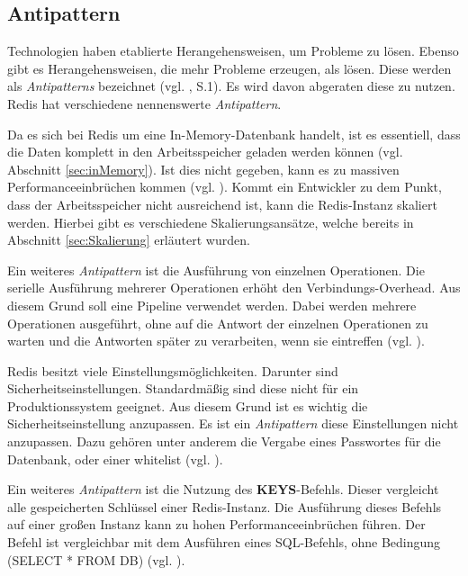 
\subsection{Antipattern}
Technologien haben etablierte Herangehensweisen, um Probleme zu lösen. Ebenso gibt es Herangehensweisen, die mehr Probleme erzeugen, als lösen. Diese werden als \textit{Antipatterns} bezeichnet (vgl. \cite{antipattern}, S.1). Es wird davon abgeraten diese zu nutzen. \acs{Redis} hat verschiedene nennenswerte \textit{Antipattern}.

Da es sich bei \acs{Redis} um eine In-Memory-Datenbank handelt, ist es essentiell, dass die Daten komplett in den Arbeitsspeicher geladen werden können (vgl. Abschnitt \ref{sec:inMemory}). Ist dies nicht gegeben, kann es zu massiven Performanceeinbrüchen kommen (vgl. \cite{Redis-Docs-antipattern}). Kommt ein Entwickler zu dem Punkt, dass der Arbeitsspeicher nicht ausreichend ist, kann die \acs{Redis}-Instanz skaliert werden. Hierbei gibt es verschiedene Skalierungsansätze, welche bereits in Abschnitt \ref{sec:Skalierung} erläutert wurden.

Ein weiteres \textit{Antipattern} ist die Ausführung von einzelnen Operationen. Die serielle Ausführung mehrerer Operationen erhöht den Verbindungs-Overhead. Aus diesem Grund soll eine Pipeline verwendet werden. Dabei werden mehrere Operationen ausgeführt, ohne auf die Antwort der einzelnen Operationen zu warten und die Antworten später zu verarbeiten, wenn sie eintreffen (vgl. \cite{Redis-Docs-antipattern}).

\acs{Redis} besitzt viele Einstellungsmöglichkeiten. Darunter sind Sicherheitseinstellungen. Standardmäßig sind diese nicht für ein Produktionssystem geeignet. Aus diesem Grund ist es wichtig die Sicherheitseinstellung anzupassen. Es ist ein \textit{Antipattern} diese Einstellungen nicht anzupassen. Dazu gehören unter anderem die Vergabe eines Passwortes für die Datenbank, oder einer \gls{whitelist} (vgl. \cite{Redis-Docs-antipattern}).

Ein weiteres \textit{Antipattern} ist die Nutzung des \textbf{KEYS}-Befehls. Dieser vergleicht alle gespeicherten Schlüssel einer \acs{Redis}-Instanz. Die Ausführung dieses Befehls auf einer großen Instanz kann zu hohen Performanceeinbrüchen führen. Der Befehl ist vergleichbar mit dem Ausführen eines SQL-Befehls, ohne Bedingung (SELECT * FROM DB) (vgl. \cite{Redis-Docs-antipattern}).